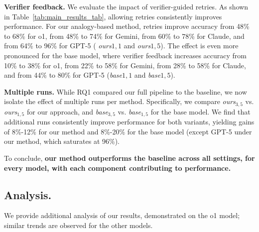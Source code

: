 \noindent\textbf{Verifier feedback.} 
We evaluate the impact of verifier-guided retries. 
As shown in Table~\ref{tab:main_results_tab}, allowing retries consistently improves performance. 
For our analogy-based method, retries improve accuracy from 48\% to 68\% for o1, from 48\% to 74\% for Gemini, from 60\% to 78\% for Claude, and from 64\% to 96\% for GPT-5 ( \textit{ours}${1,1}$ and \textit{ours}${1,5}$).
The effect is even more pronounced for the base model, where verifier feedback increases accuracy from 10\% to 38\% for o1, from 22\% to 58\% for Gemini, from 28\% to 58\% for Claude, and from 44\% to 80\% for GPT-5 (\textit{base}${1,1}$ and \textit{base}${1,5}$).



\noindent\textbf{Multiple runs.}  
While RQ1 compared our full pipeline to the baseline, we now isolate the effect of multiple runs per method. Specifically, we compare \textit{ours}$_{3,5}$ vs. \textit{ours}$_{1,5}$ for our approach, and \textit{base}$_{3,5}$ vs. \textit{base}$_{1,5}$ for the base model. 
We find that additional runs consistently improve performance for both variants, yielding gains of  8\%-12\% for our method and 8\%-20\% for the base model (except GPT-5 under our method, which saturates at 96\%).


To conclude, \textbf{our method outperforms the baseline across all settings, for every model, with each component contributing to performance.}  


















\subsection{Analysis.}
\label{subsec:further_analysis}
We provide additional analysis of our results, demonstrated on the o1 model; similar trends are observed for the other models.



